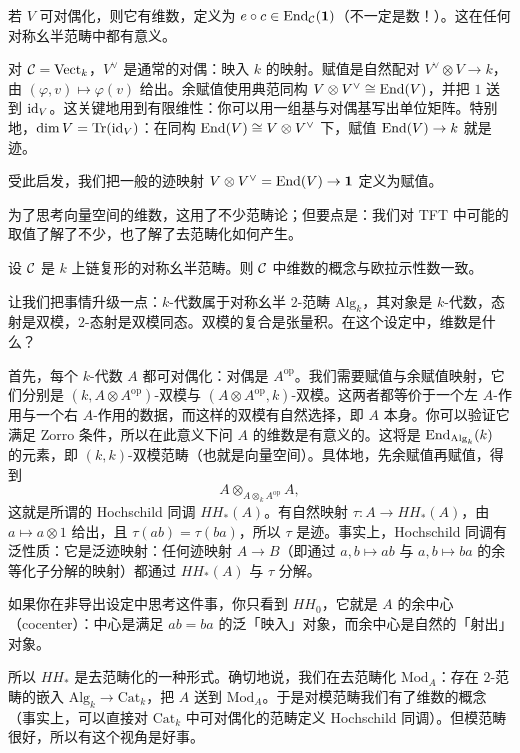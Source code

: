 若 $V$ 可对偶化，则它有维数，定义为 $e\circ c\in\operatorname{End}_{\mathcal{C}}(\mathbf{1})$（不一定是数！）。这在任何对称幺半范畴中都有意义。

\begin{example}
对 $\mathcal{C}=\mathrm{Vect}_k$，$V^\vee$ 是通常的对偶：映入 $k$ 的映射。赋值是自然配对 $V^\vee\otimes V\to k$，由 $(\varphi,v)\mapsto\varphi(v)$ 给出。余赋值使用典范同构 $V\otimes V^\vee\cong\operatorname{End}(V)$，并把 $1$ 送到 $\operatorname{id}_V$。这关键地用到有限维性：你可以用一组基与对偶基写出单位矩阵。特别地，$\dim V=\operatorname{Tr}(\operatorname{id}_V)$：在同构 $\operatorname{End}(V)\cong V\otimes V^\vee$ 下，赋值 $\operatorname{End}(V)\to k$ 就是迹。
\end{example}

受此启发，我们把一般的迹映射 $V\otimes V^\vee=\operatorname{End}(V)\to\mathbf{1}$ 定义为赋值。

为了思考向量空间的维数，这用了不少范畴论；但要点是：我们对 TFT 中可能的取值了解了不少，也了解了去范畴化如何产生。

\begin{example}
设 $\mathcal{C}$ 是 $k$ 上链复形的对称幺半范畴。则 $\mathcal{C}$ 中维数的概念与欧拉示性数一致。
\end{example}

\begin{example}
让我们把事情升级一点：$k$-代数属于对称幺半 $2$-范畴 $\mathrm{Alg}_k$，其对象是 $k$-代数，态射是双模，$2$-态射是双模同态。双模的复合是张量积。在这个设定中，维数是什么？

首先，每个 $k$-代数 $A$ 都可对偶化：对偶是 $A^{\mathrm{op}}$。我们需要赋值与余赋值映射，它们分别是 $(k,A\otimes A^{\mathrm{op}})$-双模与 $(A\otimes A^{\mathrm{op}},k)$-双模。这两者都等价于一个左 $A$-作用与一个右 $A$-作用的数据，而这样的双模有自然选择，即 $A$ 本身。你可以验证它满足 Zorro 条件，所以在此意义下问 $A$ 的维数是有意义的。这将是 $\operatorname{End}_{\mathrm{Alg}_k}(k)$ 的元素，即 $(k,k)$-双模范畴（也就是向量空间）。具体地，先余赋值再赋值，得到
\[
A\otimes_{A\otimes_k A^{\mathrm{op}}}A,
\]
这就是所谓的 Hochschild 同调 $HH_*(A)$。有自然映射 $\tau\colon A\to HH_*(A)$，由 $a\mapsto a\otimes 1$ 给出，且 $\tau(ab)=\tau(ba)$，所以 $\tau$ 是迹。事实上，Hochschild 同调有泛性质：它是泛迹映射：任何迹映射 $A\to B$（即通过 $a,b\mapsto ab$ 与 $a,b\mapsto ba$ 的余等化子分解的映射）都通过 $HH_*(A)$ 与 $\tau$ 分解。

如果你在非导出设定中思考这件事，你只看到 $HH_0$，它就是 $A$ 的余中心（cocenter）：中心是满足 $ab=ba$ 的泛「映入」对象，而余中心是自然的「射出」对象。
\end{example}

所以 $HH_*$ 是去范畴化的一种形式。确切地说，我们在去范畴化 $\mathrm{Mod}_A$：存在 $2$-范畴的嵌入 $\mathrm{Alg}_k\to\mathrm{Cat}_k$，把 $A$ 送到 $\mathrm{Mod}_A$。于是对模范畴我们有了维数的概念（事实上，可以直接对 $\mathrm{Cat}_k$ 中可对偶化的范畴定义 Hochschild 同调）。但模范畴很好，所以有这个视角是好事。

